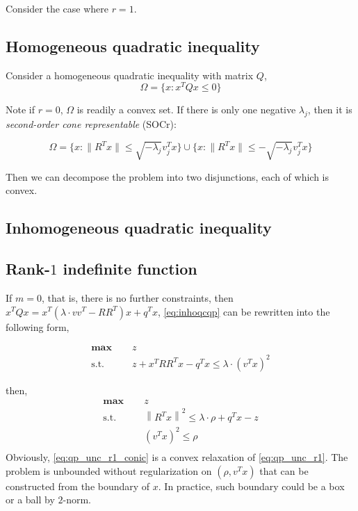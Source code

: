 \documentclass[a4paper, 10pt]{article}
\newcommand{\mx}{\mathbf{\max}\;}
\newcommand{\st}{\mathrm{s.t.\;}}
\begin{document}
Consider the case where \(r=1\).
\subsection{Homogeneous quadratic inequality}
Consider a homogeneous quadratic inequality with matrix \(Q\),
\begin{equation}
    \Omega = \{x: x^TQx \le 0\}
\end{equation}


Note if \(r = 0\), \( \Omega\) is readily a convex set. If there is only one negative \(\lambda_j\), then it is \emph{second-order cone representable} (SOCr):

\begin{equation}
    \Omega = \{x: \|R^Tx\| \le \sqrt {-\lambda_j} v_j^Tx \} \cup \{x: \|R^Tx\| \le - \sqrt {-\lambda_j} v_j^Tx \}
\end{equation}

Then we can decompose the problem into two disjunctions, each of which is convex.


\subsection{Inhomogeneous quadratic inequality}
\subsection{Rank-\(1\) indefinite function}

If \(m = 0\), that is, there is no further constraints, then \(x^TQx = x^T(\lambda\cdot vv^T-RR^T)x + q^Tx\), \eqref{eq:inhoqcqp} can be rewritten into the following form,

\begin{equation}\label{eq:qp_unc_r1}
    \begin{aligned}
        \mx \quad & z                                              \\
        \st \quad & z + x^TRR^Tx - q^Tx \le \lambda \cdot (v^Tx)^2
    \end{aligned}
\end{equation}

then,
\begin{equation}\label{eq:qp_unc_r1_conic}
    \begin{aligned}
        \mx \quad & z                                                         \\
        \st \quad & \left\|R^Tx \right \|^2 \le \lambda \cdot \rho + q^Tx - z \\
                  & (v^Tx)^2 \le \rho                                         \\
    \end{aligned}
\end{equation}
Obviously, \eqref{eq:qp_unc_r1_conic} is a convex relaxation of \eqref{eq:qp_unc_r1}. The problem is unbounded without regularization on \((\rho, v^Tx)\) that can be constructed from the boundary of \(x\). In practice, such boundary could be a box or a ball by \(2\)-norm.
\end{document}

